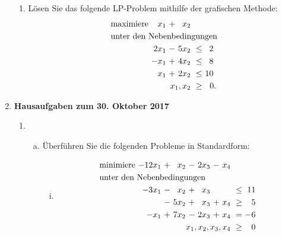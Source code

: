 \documentclass[10pt, a4paper]{article}
\begin{document}
\begin{enumerate}[\bfseries A:]
\begin{enumerate}[\bfseries 1.]
\item Lösen Sie das folgende LP-Problem mithilfe der grafischen Methode: 
\begin{align*}
\begin{alignedat}{4}
& \text{maximiere } & x_1 &\ + &\ x_2 & & \\
& \rlap{unter den Nebenbedingungen} & & & & & \\
&& 2x_1 &\ - &\ 5x_2 &\ \leq &\  2\ \\
&& -x_1 &\ + &\ 4x_2 &\ \leq &\  8\ \\
&&  x_1 &\ + &\ 2x_2 &\ \leq &\ 10\ \\
&& & & \llap{$x_1,x_2$} &\ \geq &\ 0.
\end{alignedat}
\end{align*}

\end{enumerate}


\item \textbf{Hausaufgaben zum 30. Oktober 2017}

\begin{enumerate}[\bfseries 1.]

\item 
\begin{enumerate}[a)]
\item Überführen Sie die folgenden Probleme in Standardform:
\begin{enumerate}[(i)]
\item \begin{align*}
\begin{alignedat}{6}
& \text{minimiere } & -12x_1 &\ + &\ x_2 &\ - &\ 2x_3 &\ - &\ x_4 & & \\
& \rlap{unter den Nebenbedingungen} & & & & & & & & & \\
&& -3x_1 &\ - &\  x_2 &\ + &\  x_3 &    &       &\ \leq &\ 11 \\
&&       &\ - &\ 5x_2 &\ + &\  x_3 &\ + &\  x_4 &\ \geq &\  5 \\
&&  -x_1 &\ + &\ 7x_2 &\ - &\ 2x_3 &\ + &\  x_4 &\ =    &\ -6 \\
&& & & & & & & \llap{$x_1, x_2, x_3,x_4$} &\ \geq &\ 0
\end{alignedat}
\end{align*}


\end{enumerate}
\end{enumerate}
\end{enumerate}
\end{enumerate}
\end{document}
